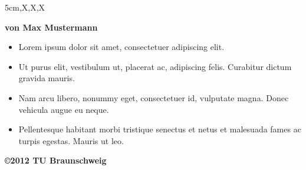 \documentclass[a2paper,style=scifi,table,parskip=full]{tubsposter}
\begin{document}
  \begin{tubsposter}[sender=bottom]{5cm,X,X,X}
  \showtubslogo[right]
  \begin{posterrow}[bgcolor=tubsLightGray]
    \vfill
    \bfseries\large von Max Mustermann
  \end{posterrow}
  \begin{posterrow}[X,X]
    \begin{postercol}
      \lipsum[2]
    \end{postercol}
    \begin{postercol}
      \itshape\centering\lipsum[3]
    \end{postercol}
  \end{posterrow}
  \begin{posterrow}[28cm,X]
    \begin{postercol}
      \begin{itemize}
        \item Lorem ipsum dolor sit amet, consectetuer adipiscing elit.
        \item Ut purus elit, vestibulum ut, placerat ac, adipiscing felis.
          Curabitur dictum gravida mauris.
        \item Nam arcu libero, nonummy eget, consectetuer id, vulputate magna.
          Donec vehicula augue eu neque.
        \item Pellentesque habitant morbi tristique
          senectus et netus et malesuada fames ac turpis egestas.
          Mauris ut leo. 
      \end{itemize}
    \end{postercol}
    \begin{postercol}[bgimage=infozentrum]
    \end{postercol}
  \end{posterrow}
  \begin{modrow}[fgcolor=tubsBlueDark]
    \lipsum[4]\par\lipsum[5]
    \vfill
    \bfseries\raggedleft\copyright 2012 TU Braunschweig
  \end{modrow}
  \end{tubsposter}
\end{document}
